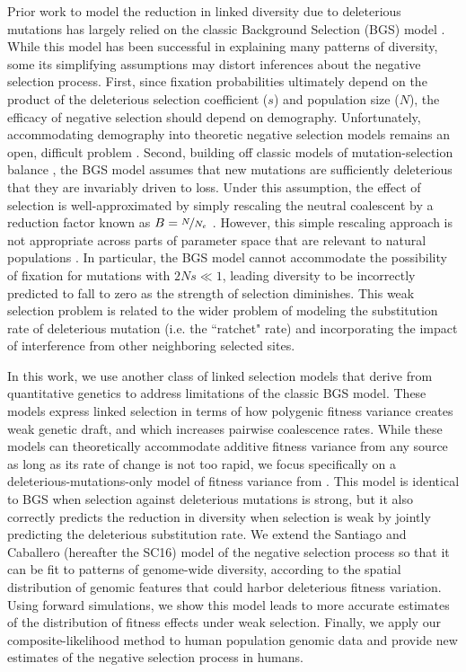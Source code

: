 \documentclass[11pt]{article}
\begin{document}
Prior work to model the reduction in linked diversity due to deleterious
mutations has largely relied on the classic Background Selection (BGS) model
\parencite{Charlesworth1993-gb,Nordborg1996-nq,Hudson1995-pt,Hudson1995-xc}.
While this model has been successful in explaining many patterns of diversity,
some its simplifying assumptions may distort inferences about the negative
selection process. First, since fixation probabilities ultimately depend on the
product of the deleterious selection coefficient ($s$) and population size
($N$), the efficacy of negative selection should depend on demography.
Unfortunately, accommodating demography into theoretic negative selection
models remains an open, difficult problem \parencite{Zeng2013-ep,Johri2020-oj}.
Second, building off classic models of mutation-selection balance
\parencite{Crow1970-wm,Kimura1966-bk}, the BGS model assumes that new mutations
are sufficiently deleterious that they are invariably driven to loss. Under
this assumption, the effect of selection is well-approximated by simply
rescaling the neutral coalescent by a reduction factor known as $B =
\nicefrac{N}{N_e}$ \parencite{Charlesworth2013-kl}. However, this simple
rescaling approach is not appropriate across parts of parameter space that are
relevant to natural populations \parencite{McVean2000-bt,Good2014-yz}. In
particular, the BGS model cannot accommodate the possibility of fixation for
mutations with $2Ns \ll 1$, leading diversity to be incorrectly predicted to
fall to zero as the strength of selection diminishes. This weak selection
problem is related to the wider problem of modeling the substitution rate of
deleterious mutation (i.e. the ``ratchet" rate) and incorporating the impact of
interference from other neighboring selected sites.

In this work, we use another class of linked selection models that derive from
quantitative genetics to address limitations of the classic BGS model. These
models express linked selection in terms of how polygenic fitness variance
creates weak genetic draft, and which increases pairwise coalescence rates.
While these models can theoretically accommodate additive fitness variance from
any source as long as its rate of change is not too rapid, we focus
specifically on a deleterious-mutations-only model of fitness variance from
\textcite{Santiago2016-mu}. This model is identical to BGS when selection
against deleterious mutations is strong, but it also correctly predicts the
reduction in diversity when selection is weak by jointly predicting the
deleterious substitution rate. We extend the Santiago and Caballero (hereafter
the SC16) model of the negative selection process so that it can be fit to
patterns of genome-wide diversity, according to the spatial distribution of
genomic features that could harbor deleterious fitness variation. Using forward
simulations, we show this model leads to more accurate estimates of the
distribution of fitness effects under weak selection. Finally, we apply our
composite-likelihood method to human population genomic data and provide new
estimates of the negative selection process in humans.
\end{document}
